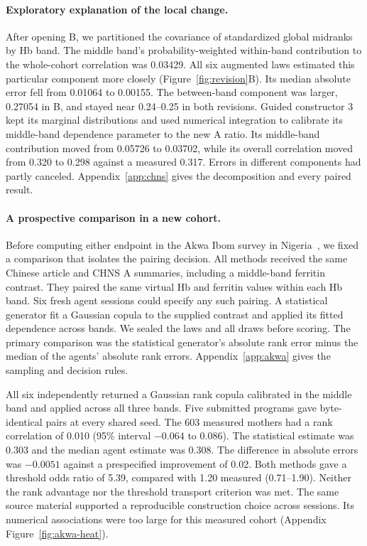 \documentclass[sigconf,anonymous,review]{acmart}
\begin{document}
\paragraph{Exploratory explanation of the local change.}
After opening B, we partitioned the covariance of standardized global midranks by Hb band. The middle band's probability-weighted within-band contribution to the whole-cohort correlation was 0.03429. All six augmented laws estimated this particular component more closely (Figure~\ref{fig:revision}B). Its median absolute error fell from 0.01064 to 0.00155. The between-band component was larger, 0.27054 in B, and stayed near 0.24--0.25 in both revisions. Guided constructor 3 kept its marginal distributions and used numerical integration to calibrate its middle-band dependence parameter to the new A ratio. Its middle-band contribution moved from 0.05726 to 0.03702, while its overall correlation moved from 0.320 to 0.298 against a measured 0.317. Errors in different components had partly canceled. Appendix~\ref{app:chns} gives the decomposition and every paired result.

\paragraph{A prospective comparison in a new cohort.}
Before computing either endpoint in the Akwa Ibom survey in Nigeria~\cite{akwa_iron}, we fixed a comparison that isolates the pairing decision. All methods received the same Chinese article and CHNS A summaries, including a middle-band ferritin contrast. They paired the same virtual Hb and ferritin values within each Hb band. Six fresh agent sessions could specify any such pairing. A statistical generator fit a Gaussian copula to the supplied contrast and applied its fitted dependence across bands. We sealed the laws and all draws before scoring. The primary comparison was the statistical generator's absolute rank error minus the median of the agents' absolute rank errors. Appendix~\ref{app:akwa} gives the sampling and decision rules.

All six independently returned a Gaussian rank copula calibrated in the middle band and applied across all three bands. Five submitted programs gave byte-identical pairs at every shared seed. The 603 measured mothers had a rank correlation of 0.010 (95\% interval $-0.064$ to 0.086). The statistical estimate was 0.303 and the median agent estimate was 0.308. The difference in absolute errors was $-0.0051$ against a prespecified improvement of 0.02. Both methods gave a threshold odds ratio of 5.39, compared with 1.20 measured (0.71--1.90). Neither the rank advantage nor the threshold transport criterion was met. The same source material supported a reproducible construction choice across sessions. Its numerical associations were too large for this measured cohort (Appendix Figure~\ref{fig:akwa-heat}).
\end{document}

